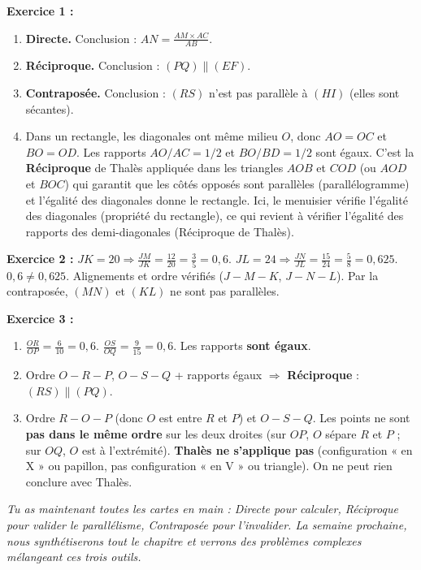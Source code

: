 \documentclass[11pt]{article}
\begin{document}
\begin{corrige}
\textbf{Exercice 1 :}
\begin{enumerate}
    \item \textbf{Directe.} Conclusion : $AN = \frac{AM \times AC}{AB}$.
    \item \textbf{Réciproque.} Conclusion : $(PQ) \parallel (EF)$.
    \item \textbf{Contraposée.} Conclusion : $(RS)$ n'est pas parallèle à $(HI)$ (elles sont sécantes).
    \item Dans un rectangle, les diagonales ont même milieu $O$, donc $AO=OC$ et $BO=OD$. Les rapports $AO/AC = 1/2$ et $BO/BD = 1/2$ sont égaux. C'est la \textbf{Réciproque} de Thalès appliquée dans les triangles $AOB$ et $COD$ (ou $AOD$ et $BOC$) qui garantit que les côtés opposés sont parallèles (parallélogramme) et l'égalité des diagonales donne le rectangle. Ici, le menuisier vérifie l'égalité des diagonales (propriété du rectangle), ce qui revient à vérifier l'égalité des rapports des demi-diagonales (Réciproque de Thalès).
\end{enumerate}

\textbf{Exercice 2 :}
$JK = 20 \Rightarrow \frac{JM}{JK} = \frac{12}{20} = \frac{3}{5} = 0,6$.
$JL = 24 \Rightarrow \frac{JN}{JL} = \frac{15}{24} = \frac{5}{8} = 0,625$.
$0,6 \neq 0,625$.
Alignements et ordre vérifiés ($J-M-K$, $J-N-L$).
Par la contraposée, $(MN)$ et $(KL)$ ne sont pas parallèles.

\textbf{Exercice 3 :}
\begin{enumerate}
    \item $\frac{OR}{OP} = \frac{6}{10} = 0,6$. $\frac{OS}{OQ} = \frac{9}{15} = 0,6$. Les rapports \textbf{sont égaux}.
    \item Ordre $O-R-P$, $O-S-Q$ + rapports égaux $\Rightarrow$ \textbf{Réciproque} : $(RS) \parallel (PQ)$.
    \item Ordre $R-O-P$ (donc $O$ est entre $R$ et $P$) et $O-S-Q$. Les points ne sont \textbf{pas dans le même ordre} sur les deux droites (sur $OP$, $O$ sépare $R$ et $P$ ; sur $OQ$, $O$ est à l'extrémité).
    \textbf{Thalès ne s'applique pas} (configuration « en X » ou papillon, pas configuration « en V » ou triangle). On ne peut rien conclure avec Thalès.
\end{enumerate}
\end{corrige}

\emph{Tu as maintenant toutes les cartes en main : Directe pour calculer, Réciproque pour valider le parallélisme, Contraposée pour l'invalider. La semaine prochaine, nous synthétiserons tout le chapitre et verrons des problèmes complexes mélangeant ces trois outils.}
\end{document}
